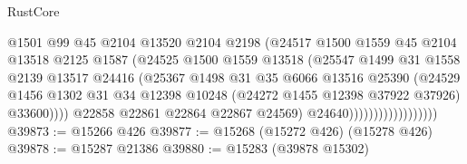 \begin{lexlean}{RustCore}
\begin{coremodule}
                                        @1501
                                        @99
                                        @45
                                        @2104
                                        @13520
                                        @2104
                                        @2198
                                        (@24517
                                          @1500
                                          @1559
                                          @45
                                          @2104
                                          @13518
                                          @2125
                                          @1587
                                          (@24525
                                            @1500
                                            @1559
                                            @13518
                                            (@25547
                                              @1499
                                              @31
                                              @1558
                                              @2139
                                              @13517
                                              @24416
                                              (@25367
                                                @1498
                                                @31
                                                @35
                                                @6066
                                                @13516
                                                @25390
                                                (@24529
                                                  @1456
                                                  @1302
                                                  @31
                                                  @34
                                                  @12398
                                                  @10248
                                                  (@24272 @1455 @12398 @37922 @37926)
                                                  @33600))))
                                          @22858
                                          @22861
                                          @22864
                                          @22867
                                          @24569)
                                        @24640))))))))))))))))))
@39873 := @15266 @426
@39877 := @15268 (@15272 @426) (@15278 @426)
@39878 := @15287 @21386
@39880 := @15283 (@39878 @15302)

\end{coremodule}
\end{lexlean}
